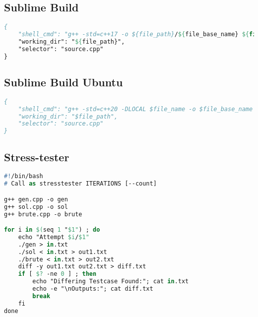 \subsection*{Sublime Build}
\begin{lstlisting}[language= Pascal, commentstyle=\color{black}, numberstyle=\tiny\color{black}, keywordstyle=\color{black}, stringstyle=\color{black},
]
{
    "shell_cmd": "g++ -std=c++17 -o ${file_path}/${file_base_name} ${file} && ${file_path}/${file_base_name} < input.txt > output.txt",
    "working_dir": "${file_path}",
    "selector": "source.cpp"
}
\end{lstlisting}
\subsection*{Sublime Build Ubuntu}

\begin{lstlisting}[language= Pascal, commentstyle=\color{black}, numberstyle=\tiny\color{black}, keywordstyle=\color{black}, stringstyle=\color{black},
]
{
    "shell_cmd": "g++ -std=c++20 -DLOCAL $file_name -o $file_base_name &&timeout 5s ./$file_base_name<in.txt>out.txt",
    "working_dir": "$file_path",
    "selector": "source.cpp"
}
\end{lstlisting}

\subsection*{Stress-tester}
\begin{lstlisting}[language= Pascal, commentstyle=\color{black}, numberstyle=\tiny\color{black}, keywordstyle=\color{black}, stringstyle=\color{black},
]
#!/bin/bash
# Call as stresstester ITERATIONS [--count]

g++ gen.cpp -o gen
g++ sol.cpp -o sol
g++ brute.cpp -o brute

for i in $(seq 1 "$1") ; do
    echo "Attempt $i/$1"
    ./gen > in.txt
    ./sol < in.txt > out1.txt
    ./brute < in.txt > out2.txt
    diff -y out1.txt out2.txt > diff.txt
    if [ $? -ne 0 ] ; then
        echo "Differing Testcase Found:"; cat in.txt
        echo -e "\nOutputs:"; cat diff.txt
        break
    fi
done
\end{lstlisting}
